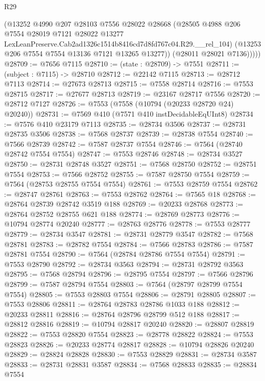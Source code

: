 \begin{lexlean}{R29}
\begin{coremodule}
            (@13252
              @4990
              @207
              @28103
              @7556
              @28022
              @28668
              (@28505
                @4988
                @206
                @7554
                @28019
                @7121
                @28022
                @13277
                LexLeanPreserve.Cab2ad1326c1514b8416cd7d8fd767c04.R29.__rel_104)
              (@13253 @206 @7554 @7554 @13136 @7121 @13265 @13277))
            (@28011 @28021 @7136)))))
@28709 := @7656 @7115
@28710 := (state : @28709) -> @7551
@28711 := (subject : @7115) -> @28710
@28712 := @22142 @7115
@28713 := @28712 @7113
@28714 := @27673 @28713
@28715 := @7558 @28714
@28716 := @7553 @28715
@28717 := @27677 @28713
@28719 := @23167 @28717 @7556
@28720 := @28712 @7127
@28726 := @7553 (@7558 (@10794 (@20233 @28720 @24) @20240))
@28731 := @7569 @410 (@7571 @410 instDecidableEqUInt8)
@28734 := @7576 @410 @23179 @7113
@28735 := @28734 @3506
@28737 := @28731 @28735 @3506
@28738 := @7568 @28737
@28739 := @28738 @7554
@28740 := @7566 @28739
@28742 := @7587 @28737 @7554
@28746 := @7564 (@28740 @28742 @7554 @7554)
@28747 := @7553 @28746
@28748 := @28734 @3527
@28750 := @28731 @28748 @3527
@28751 := @7568 @28750
@28752 := @28751 @7554
@28753 := @7566 @28752
@28755 := @7587 @28750 @7554
@28759 := @7564 (@28753 @28755 @7554 @7554)
@28761 := @7553 @28759 @7554
@28762 := @28747 @28761
@28763 := @7553 @28762
@28764 := @7565 @18
@28768 := @28764 @28739 @28742 @3519 @188
@28769 := @20233 @28768
@28773 := @28764 @28752 @28755 @621 @188
@28774 := @28769 @28773
@28776 := @10794 @28774 @20240
@28777 := @28763 @28776
@28778 := @7553 @28777
@28779 := @28734 @3547
@28781 := @28731 @28779 @3547
@28782 := @7568 @28781
@28783 := @28782 @7554
@28784 := @7566 @28783
@28786 := @7587 @28781 @7554
@28790 := @7564 (@28784 @28786 @7554 @7554)
@28791 := @7553 @28790
@28792 := @28734 @3563
@28794 := @28731 @28792 @3563
@28795 := @7568 @28794
@28796 := @28795 @7554
@28797 := @7566 @28796
@28799 := @7587 @28794 @7554
@28803 := @7564 (@28797 @28799 @7554 @7554)
@28805 := @7553 @28803 @7554
@28806 := @28791 @28805
@28807 := @7553 @28806
@28811 := @28764 @28783 @28786 @1033 @188
@28812 := @20233 @28811
@28816 := @28764 @28796 @28799 @512 @188
@28817 := @28812 @28816
@28819 := @10794 @28817 @20240
@28820 := @28807 @28819
@28822 := @7553 @28820 @7554
@28823 := @28778 @28822
@28824 := @7553 @28823
@28826 := @20233 @28774 @28817
@28828 := @10794 @28826 @20240
@28829 := @28824 @28828
@28830 := @7553 @28829
@28831 := @28734 @3587
@28833 := @28731 @28831 @3587
@28834 := @7568 @28833
@28835 := @28834 @7554

\end{coremodule}
\end{lexlean}
